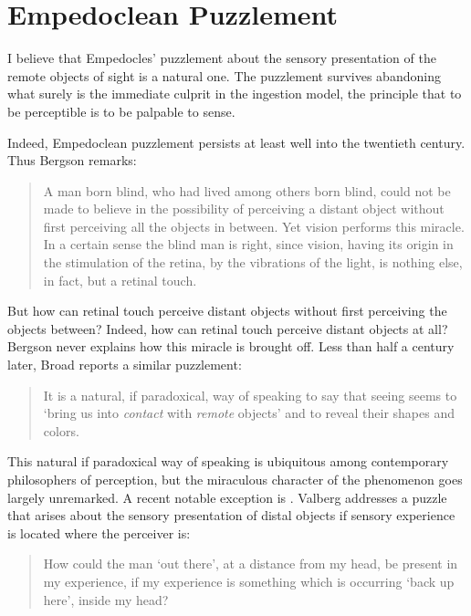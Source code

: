 
\section{Empedoclean Puzzlement} %
\label{sec:empedoclean_puzzlement}

I believe that Empedocles' puzzlement about the sensory presentation of the remote objects of sight is a natural one. The puzzlement survives abandoning what surely is the immediate culprit in the ingestion model, the principle that to be perceptible is to be palpable to sense. 

Indeed, Empedoclean puzzlement persists at least well into the twentieth century. Thus Bergson remarks:
\begin{quote}
	A man born blind, who had lived among others born blind, could not be made to believe in the possibility of perceiving a distant object without first perceiving all the objects in between. Yet vision performs this miracle. In a certain sense the blind man is right, since vision, having its origin in the stimulation of the retina, by the vibrations of the light, is nothing else, in fact, but a retinal touch. \citep[168]{Bergson:1907sh}
\end{quote}
But how can retinal touch perceive distant objects without first perceiving the objects between? Indeed, how can retinal touch perceive distant objects at all? Bergson never explains how this miracle is brought off. Less than half a century later, Broad reports a similar puzzlement:
\begin{quote}
    It is a natural, if paradoxical, way of speaking to say that seeing seems to `bring us into \emph{contact} with \emph{remote} objects' and to reveal their shapes and colors. \citep[33]{Broad:1952kx}
\end{quote}
This natural if paradoxical way of speaking is ubiquitous among contemporary philosophers of perception, but the miraculous character of the phenomenon goes largely unremarked. A recent notable exception is \citet{Valberg:1992aa}. Valberg addresses a puzzle that arises about the sensory presentation of distal objects if sensory experience is located where the perceiver is:
\begin{quote}
	How could the man `out there', at a distance from my head, be present in my experience, if my experience is something which is occurring `back up here', inside my head? \citep[141]{Valberg:1992aa}
\end{quote}

